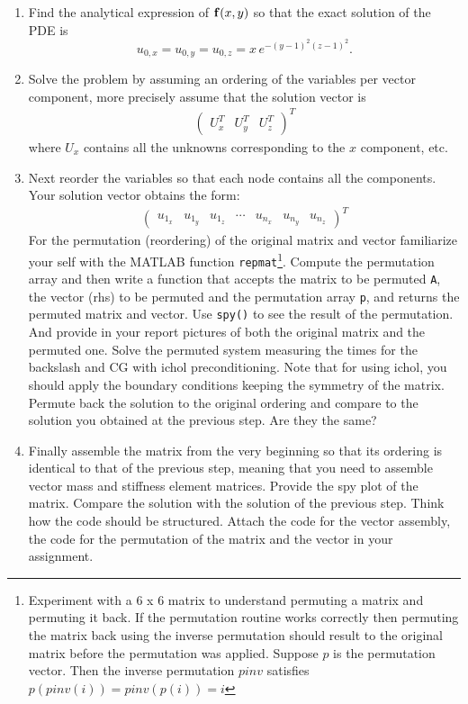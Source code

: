 \documentclass[unicode,11pt,a4paper,oneside,numbers=endperiod,openany]{scrartcl}
\def\f{{\bf f}}
\begin{document}
\begin{enumerate}
\item Find the analytical expression of $\f(x,y)$ so that the exact 
solution of the PDE is \[u_{0,x} = u_{0,y} = u_{0,z} =x\, e^{-(y-1)^2 (z-1)^2}.\] 
\item Solve the problem by assuming an ordering of the variables per vector component,
more precisely assume that the solution vector is 
\begin{align}
\left (
\begin{array}{ccc}
U_x^T & U_y^T & U_z^T
\end{array}
\right )^T
\end{align}
where $U_x$ contains all the unknowns corresponding to the $x$ component, etc.
\item Next reorder the variables so that each node contains all the components. 
Your solution vector obtains the form:
\begin{align}
\left (
\begin{array}{ccccccc}
u_{1_x} & u_{1_y} & u_{1_z} & \cdots & u_{n_x} & u_{n_y} & u_{n_z}
\end{array}
\right )^T
\end{align}
For the permutation (reordering) of the original matrix and vector familiarize your self
with the MATLAB function \lstinline+repmat+\footnote{Experiment with a 6 x 6 matrix to understand permuting a matrix and permuting it back. If the permutation routine works correctly then permuting the matrix back using the inverse permutation should result to the original matrix before the permutation was applied. Suppose $p$ is the permutation vector. Then the inverse permutation $pinv$ satisfies $p(pinv(i)) = pinv(p(i)) = i$}. Compute the permutation array
and then write a function that accepts the matrix to be permuted \lstinline+A+,
the vector (rhs) to be permuted and the permutation array \lstinline+p+,
and returns the permuted matrix and vector. Use \lstinline+spy()+ to see the result
of the permutation. And provide in your report pictures of both the original matrix
and the permuted one. Solve the permuted system measuring the times for the backslash
and CG with ichol preconditioning. Note that for using ichol, you should apply the 
boundary conditions keeping the symmetry of the matrix. Permute back the solution
to the original ordering and compare to the solution you obtained at the previous 
step. Are they the same?

\item Finally assemble the matrix from the very beginning so that its ordering
is identical to that of the previous step, meaning that you need to assemble
vector mass and stiffness element matrices. 
Provide the spy plot of the matrix. Compare the solution with the solution of 
the previous step. Think how the code should be structured. Attach the code 
for the vector assembly, the code for the permutation of the matrix and the vector
in your assignment. 
\end{enumerate}
\end{document}
